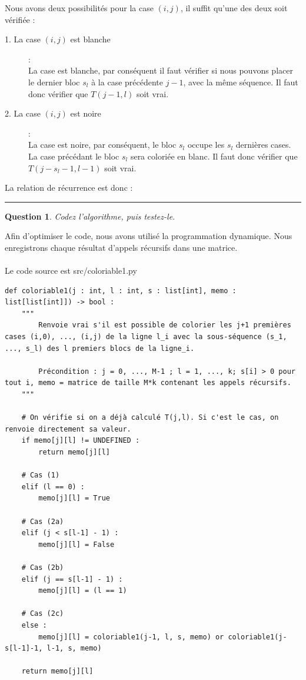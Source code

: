 \documentclass[a4paper,12pt]{article}
\newtheorem{exo}{Question}
\begin{document}
Nous avons deux possibilités pour la case $(i,j)$, il suffit qu'une des deux soit vérifiée :
\begin{description}
	\item[1. La case $(i,j)$ est blanche] :\\
	La case est blanche, par conséquent il faut vérifier si nous pouvons placer le dernier bloc $s_l$ à la case précédente $j-1$, avec la même séquence. Il faut donc vérifier que $T(j-1, l)$ soit vrai.

	\item[2. La case $(i,j)$ est noire] :\\
	La case est noire, par conséquent, le bloc $s_l$ occupe les $s_l$ dernières cases. La case précédant le bloc $s_l$ sera coloriée en blanc. Il faut donc vérifier que $T(j-s_l-1, l-1)$ soit vrai.
\end{description}

La relation de récurrence est  donc : 
\\

\noindent\rule{\textwidth}{1pt}


\begin{exo}
	Codez l'algorithme, puis testez-le.
\end{exo}

Afin d'optimiser le code, nous avons utilisé la programmation dynamique. Nous enregistrons chaque résultat d'appels récursifs dans une matrice.\\\\
Le code source est src/coloriable1.py\\

\newpage

\begin{lstlisting}
def coloriable1(j : int, l : int, s : list[int], memo : list[list[int]]) -> bool :
    """
        Renvoie vrai s'il est possible de colorier les j+1 premières cases (i,0), ..., (i,j) de la ligne l_i avec la sous-séquence (s_1, ..., s_l) des l premiers blocs de la ligne_i.
    
        Précondition : j = 0, ..., M-1 ; l = 1, ..., k; s[i] > 0 pour tout i, memo = matrice de taille M*k contenant les appels récursifs.
    """
        
    # On vérifie si on a déjà calculé T(j,l). Si c'est le cas, on renvoie directement sa valeur.
    if memo[j][l] != UNDEFINED :
        return memo[j][l]
    
    # Cas (1)
    elif (l == 0) :
        memo[j][l] = True
        
    # Cas (2a)
    elif (j < s[l-1] - 1) :
        memo[j][l] = False
        
    # Cas (2b)
    elif (j == s[l-1] - 1) :
        memo[j][l] = (l == 1)
    
    # Cas (2c)  
    else :
        memo[j][l] = coloriable1(j-1, l, s, memo) or coloriable1(j-s[l-1]-1, l-1, s, memo)
        
    return memo[j][l]
\end{lstlisting}
\end{document}
